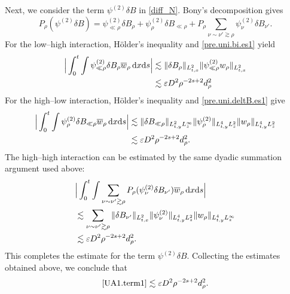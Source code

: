 \documentclass[11pt,letterpaper,reqno]{amsart}
\numberwithin{equation}{section}
\theoremstyle{definition}
\theoremstyle{remark}
\begin{document}
Next, we consider the term \(\psi^{(2)}\delta B\) in \eqref{diff_N}. Bony's decomposition gives
\[
        P_\rho(\psi^{(2)}\delta B)
        =
       \psi^{(2)}_{\ll\rho}\delta B_\rho
        +
       \psi^{(2)}_\rho\delta B_{\ll\rho}
        +
        P_\rho
        \sum_{\nu\sim\nu'\gtrsim\rho}
        \psi^{(2)}_\nu\delta B_{\nu'} .
\]
 For the low--high interaction, H\"older's inequality and \eqref{pre.uni.bi.es1} yield
\begin{align}
       \Big | 
        \int_0^t\int
       \psi^{(2)}_{\ll \rho }\delta B_\rho
        \overline{w}_\rho\,\mathrm{d} x \mathrm{d} s \Big |
        &\lesssim
        \|\delta B_\rho\|_{L^2_{t,x}}
        \| \psi^{(2)}_{\ll \rho }  w_\rho \|_{L^2_{t,x}}                                     \notag\\
        &\lesssim
           \varepsilon    D^2\rho^{-2s+2} d^2_\rho
\end{align}
For the high--low interaction, H\"older's inequality and \eqref{pre.uni.deltB.es1} give
\begin{align}
        \Big|   
        \int_0^t\int
         \psi^{(2)}_\rho\delta B_{\ll\rho}
        \overline{w}_\rho\,\mathrm{d} x \mathrm{d} s \Big|
        &\lesssim
        \|\delta B_{\ll \rho} \|_{L^2_{t,y} L^\infty_z}
        \|\psi^{(2)}_\rho\|_{L^4_{t,y} L^2_z}
        \|w_\rho\|_{L^4_{t,y} L^2_z}                                      \notag\\
       &\lesssim   \varepsilon D^2\rho^{-2s+2}d_\rho^2 .                     
\end{align}
The high--high interaction can be estimated by the same dyadic summation argument used above:
\begin{align*}
       & \Big| \int_0^t\int
        \sum_{\nu\sim\nu'\gtrsim\rho}  P_\rho(
        \psi^{(2)}_\nu\delta B_{\nu'} )
        \overline{w}_\rho\,\mathrm{d} x \mathrm{d} s \Big|\nonumber\\
        &\lesssim
        \sum_{\nu\sim\nu'\gtrsim\rho}
        \|\delta B_{\nu'}\|_{L^2_{t,x}}
        \|\psi^{(2)}_\nu\|_{L^4_{t,y}L^2_z}
        \|w_\rho\|_{L^4_{t,y}L^\infty_z}                         \notag\\
                &\lesssim
        \varepsilon D^2\rho^{-2s+2}d_\rho^2.          
\end{align*}
This completes the estimate for the term
\(\psi^{(2)}\delta B\). Collecting the estimates obtained above, we  conclude that
\begin{align*}
     \eqref{UA1.term1} \lesssim \varepsilon D^2\rho^{-2s+2}d_\rho^2. 
\end{align*}
\end{document}
